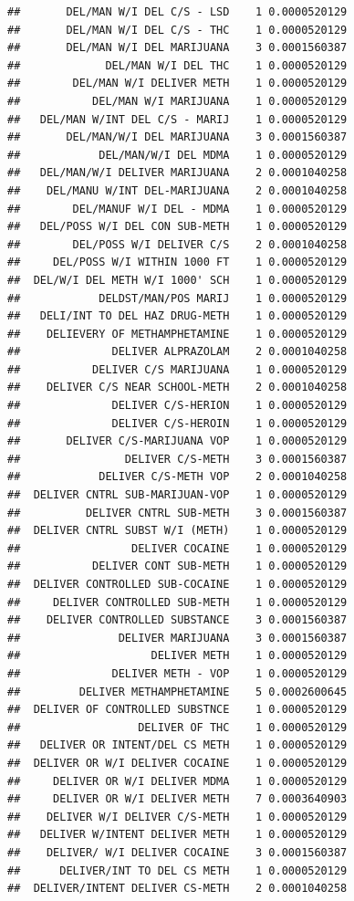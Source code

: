 \documentclass[]{book}
\begin{document}
\begin{verbatim}
##       DEL/MAN W/I DEL C/S - LSD    1 0.0000520129
##       DEL/MAN W/I DEL C/S - THC    1 0.0000520129
##       DEL/MAN W/I DEL MARIJUANA    3 0.0001560387
##             DEL/MAN W/I DEL THC    1 0.0000520129
##        DEL/MAN W/I DELIVER METH    1 0.0000520129
##           DEL/MAN W/I MARIJUANA    1 0.0000520129
##   DEL/MAN W/INT DEL C/S - MARIJ    1 0.0000520129
##       DEL/MAN/W/I DEL MARIJUANA    3 0.0001560387
##            DEL/MAN/W/I DEL MDMA    1 0.0000520129
##   DEL/MAN/W/I DELIVER MARIJUANA    2 0.0001040258
##    DEL/MANU W/INT DEL-MARIJUANA    2 0.0001040258
##        DEL/MANUF W/I DEL - MDMA    1 0.0000520129
##   DEL/POSS W/I DEL CON SUB-METH    1 0.0000520129
##        DEL/POSS W/I DELIVER C/S    2 0.0001040258
##     DEL/POSS W/I WITHIN 1000 FT    1 0.0000520129
##  DEL/W/I DEL METH W/I 1000' SCH    1 0.0000520129
##            DELDST/MAN/POS MARIJ    1 0.0000520129
##   DELI/INT TO DEL HAZ DRUG-METH    1 0.0000520129
##    DELIEVERY OF METHAMPHETAMINE    1 0.0000520129
##              DELIVER ALPRAZOLAM    2 0.0001040258
##           DELIVER C/S MARIJUANA    1 0.0000520129
##    DELIVER C/S NEAR SCHOOL-METH    2 0.0001040258
##              DELIVER C/S-HERION    1 0.0000520129
##              DELIVER C/S-HEROIN    1 0.0000520129
##       DELIVER C/S-MARIJUANA VOP    1 0.0000520129
##                DELIVER C/S-METH    3 0.0001560387
##            DELIVER C/S-METH VOP    2 0.0001040258
##  DELIVER CNTRL SUB-MARIJUAN-VOP    1 0.0000520129
##          DELIVER CNTRL SUB-METH    3 0.0001560387
##  DELIVER CNTRL SUBST W/I (METH)    1 0.0000520129
##                 DELIVER COCAINE    1 0.0000520129
##           DELIVER CONT SUB-METH    1 0.0000520129
##  DELIVER CONTROLLED SUB-COCAINE    1 0.0000520129
##     DELIVER CONTROLLED SUB-METH    1 0.0000520129
##    DELIVER CONTROLLED SUBSTANCE    3 0.0001560387
##               DELIVER MARIJUANA    3 0.0001560387
##                    DELIVER METH    1 0.0000520129
##              DELIVER METH - VOP    1 0.0000520129
##         DELIVER METHAMPHETAMINE    5 0.0002600645
##  DELIVER OF CONTROLLED SUBSTNCE    1 0.0000520129
##                  DELIVER OF THC    1 0.0000520129
##   DELIVER OR INTENT/DEL CS METH    1 0.0000520129
##  DELIVER OR W/I DELIVER COCAINE    1 0.0000520129
##     DELIVER OR W/I DELIVER MDMA    1 0.0000520129
##     DELIVER OR W/I DELIVER METH    7 0.0003640903
##    DELIVER W/I DELIVER C/S-METH    1 0.0000520129
##   DELIVER W/INTENT DELIVER METH    1 0.0000520129
##    DELIVER/ W/I DELIVER COCAINE    3 0.0001560387
##      DELIVER/INT TO DEL CS METH    1 0.0000520129
##  DELIVER/INTENT DELIVER CS-METH    2 0.0001040258

\end{verbatim}
\end{document}
